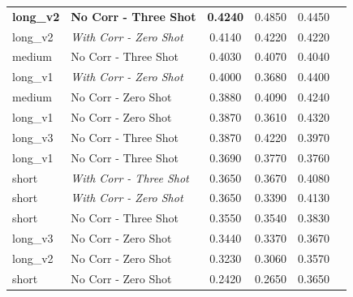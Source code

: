 \documentclass[letterpaper,journal]{IEEEtran}
\begin{document}
\begin{table}[!t]
\begin{tabular}{l|l|c|c|cl}
\textbf{long\_v2} & \textbf{No Corr - Three Shot}           & \textbf{0.4240}                        & 0.4850                                  & 0.4450                              &  \\
long\_v2          & \textit{With Corr - Zero Shot}          & 0.4140                                 & 0.4220                                  & 0.4220                              &  \\
medium            & No Corr - Three Shot                    & 0.4030                                 & 0.4070                                  & 0.4040                              &  \\
long\_v1          & \textit{With Corr - Zero Shot}          & 0.4000                                 & 0.3680                                  & 0.4400                              &  \\
medium            & No Corr - Zero Shot                     & 0.3880                                 & 0.4090                                  & 0.4240                              &  \\
long\_v1          & No Corr - Zero Shot                     & 0.3870                                 & 0.3610                                  & 0.4320                              &  \\
long\_v3          & No Corr - Three Shot                    & 0.3870                                 & 0.4220                                  & 0.3970                              &  \\
long\_v1          & No Corr - Three Shot                    & 0.3690                                 & 0.3770                                  & 0.3760                              &  \\
short             & \textit{With Corr - Three Shot}         & 0.3650                                 & 0.3670                                  & 0.4080                              &  \\
short             & \textit{With Corr - Zero Shot}          & 0.3650                                 & 0.3390                                  & 0.4130                              &  \\
short             & No Corr - Three Shot                    & 0.3550                                 & 0.3540                                  & 0.3830                              &  \\
long\_v3          & No Corr - Zero Shot                     & 0.3440                                 & 0.3370                                  & 0.3670                              &  \\
long\_v2          & No Corr - Zero Shot                     & 0.3230                                 & 0.3060                                  & 0.3570                              &  \\
short             & No Corr - Zero Shot                     & 0.2420                                 & 0.2650                                  & 0.3650                              & 
\end{tabular}
\end{table}
\end{document}
